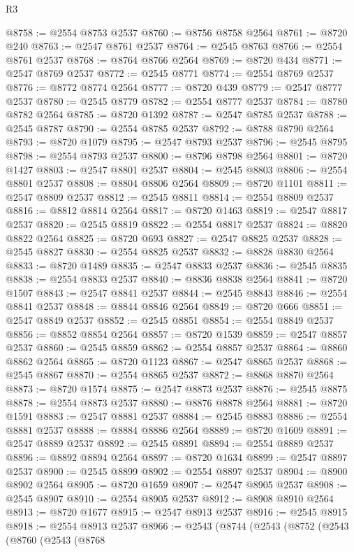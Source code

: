 \begin{lexlean}{R3}
\begin{coremodule}
@8758 := @2554 @8753 @2537
@8760 := @8756 @8758 @2564
@8761 := @8720 @240
@8763 := @2547 @8761 @2537
@8764 := @2545 @8763
@8766 := @2554 @8761 @2537
@8768 := @8764 @8766 @2564
@8769 := @8720 @434
@8771 := @2547 @8769 @2537
@8772 := @2545 @8771
@8774 := @2554 @8769 @2537
@8776 := @8772 @8774 @2564
@8777 := @8720 @439
@8779 := @2547 @8777 @2537
@8780 := @2545 @8779
@8782 := @2554 @8777 @2537
@8784 := @8780 @8782 @2564
@8785 := @8720 @1392
@8787 := @2547 @8785 @2537
@8788 := @2545 @8787
@8790 := @2554 @8785 @2537
@8792 := @8788 @8790 @2564
@8793 := @8720 @1079
@8795 := @2547 @8793 @2537
@8796 := @2545 @8795
@8798 := @2554 @8793 @2537
@8800 := @8796 @8798 @2564
@8801 := @8720 @1427
@8803 := @2547 @8801 @2537
@8804 := @2545 @8803
@8806 := @2554 @8801 @2537
@8808 := @8804 @8806 @2564
@8809 := @8720 @1101
@8811 := @2547 @8809 @2537
@8812 := @2545 @8811
@8814 := @2554 @8809 @2537
@8816 := @8812 @8814 @2564
@8817 := @8720 @1463
@8819 := @2547 @8817 @2537
@8820 := @2545 @8819
@8822 := @2554 @8817 @2537
@8824 := @8820 @8822 @2564
@8825 := @8720 @693
@8827 := @2547 @8825 @2537
@8828 := @2545 @8827
@8830 := @2554 @8825 @2537
@8832 := @8828 @8830 @2564
@8833 := @8720 @1489
@8835 := @2547 @8833 @2537
@8836 := @2545 @8835
@8838 := @2554 @8833 @2537
@8840 := @8836 @8838 @2564
@8841 := @8720 @1507
@8843 := @2547 @8841 @2537
@8844 := @2545 @8843
@8846 := @2554 @8841 @2537
@8848 := @8844 @8846 @2564
@8849 := @8720 @666
@8851 := @2547 @8849 @2537
@8852 := @2545 @8851
@8854 := @2554 @8849 @2537
@8856 := @8852 @8854 @2564
@8857 := @8720 @1539
@8859 := @2547 @8857 @2537
@8860 := @2545 @8859
@8862 := @2554 @8857 @2537
@8864 := @8860 @8862 @2564
@8865 := @8720 @1123
@8867 := @2547 @8865 @2537
@8868 := @2545 @8867
@8870 := @2554 @8865 @2537
@8872 := @8868 @8870 @2564
@8873 := @8720 @1574
@8875 := @2547 @8873 @2537
@8876 := @2545 @8875
@8878 := @2554 @8873 @2537
@8880 := @8876 @8878 @2564
@8881 := @8720 @1591
@8883 := @2547 @8881 @2537
@8884 := @2545 @8883
@8886 := @2554 @8881 @2537
@8888 := @8884 @8886 @2564
@8889 := @8720 @1609
@8891 := @2547 @8889 @2537
@8892 := @2545 @8891
@8894 := @2554 @8889 @2537
@8896 := @8892 @8894 @2564
@8897 := @8720 @1634
@8899 := @2547 @8897 @2537
@8900 := @2545 @8899
@8902 := @2554 @8897 @2537
@8904 := @8900 @8902 @2564
@8905 := @8720 @1659
@8907 := @2547 @8905 @2537
@8908 := @2545 @8907
@8910 := @2554 @8905 @2537
@8912 := @8908 @8910 @2564
@8913 := @8720 @1677
@8915 := @2547 @8913 @2537
@8916 := @2545 @8915
@8918 := @2554 @8913 @2537
@8966 := @2543
    (@8744
      (@2543
        (@8752
          (@2543
            (@8760
              (@2543
                (@8768

\end{coremodule}
\end{lexlean}
